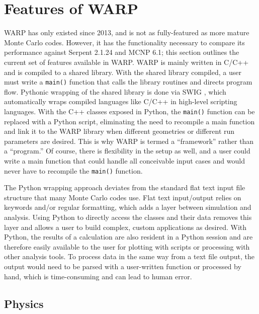 \documentclass[preprint,12pt]{elsarticle}
\begin{document}
\section{Features of WARP}
\label{sec:features}

WARP has only existed since 2013, and is not as fully-featured as more mature Monte Carlo codes.  However, it has the functionality necessary to compare its performance against Serpent 2.1.24 and MCNP 6.1; this section outlines the current set of features available in WARP.  WARP is mainly written in C/C++ and is compiled to a shared library.  With the shared library compiled, a user must write a \texttt{main()} function that calls the library routines and directs program flow.  Pythonic wrapping of the shared library is done via SWIG \cite{swig}, which automatically wraps compiled languages like C/C++ in high-level scripting languages.  With the C++ classes exposed in Python, the \texttt{main()} function can be replaced with a Python script, eliminating the need to recompile a main function and link it to the WARP library when different geometries or different run parameters are desired.  This is why WARP is termed a ``framework'' rather than a ``program.''  Of course, there is flexibility in the setup as well, and a user could write a main function that could handle all conceivable input cases and would never have to recompile the \texttt{main()} function.  

The Python wrapping approach deviates from the standard flat text input file structure that many Monte Carlo codes use.  Flat text input/output relies on keywords  and/or regular formatting, which adds a layer between simulation and analysis.  Using Python to directly access the classes and their data removes this layer and allows a user to build complex, custom applications as desired.  With Python, the results of a calculation are also resident in a Python session and are therefore easily available to the user for plotting with scripts or processing with other analysis tools.  To process data in the same way from a text file output, the output would need to be parsed with a user-written function or processed by hand, which is time-consuming and can lead to human error.

\subsection{Physics}
\end{document}
